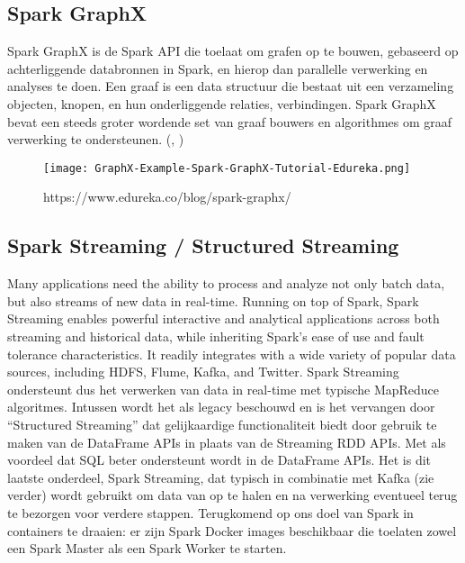 \autocite{Spark2023b}

\subsection{Spark GraphX}
Spark GraphX is de Spark API die toelaat om grafen op te bouwen, gebaseerd op achterliggende databronnen in Spark, en hierop dan parallelle verwerking en analyses te doen. 
Een graaf is een data structuur die bestaat uit een verzameling objecten, knopen, en hun onderliggende relaties, verbindingen.
Spark GraphX bevat een steeds groter wordende set van graaf bouwers en algorithmes om graaf verwerking te ondersteunen.
(\autocite{Dayananda2019}, \autocite{Wikipedia2023})
\newline
\newline
\begin{figure}
    \texttt{[image: GraphX-Example-Spark-GraphX-Tutorial-Edureka.png]}
    \caption{https://www.edureka.co/blog/spark-graphx/}
\end{figure}


\subsection{Spark Streaming / Structured Streaming}
Many applications need the ability to process and analyze not only batch data, but also streams of new data in real-time. Running on top of Spark, Spark Streaming enables powerful interactive and analytical applications across both streaming and historical data, while inheriting Spark’s ease of use and fault tolerance characteristics. It readily integrates with a wide variety of popular data sources, including HDFS, Flume, Kafka, and Twitter.\autocite{databricks2023}
\newline
\newline
Spark Streaming ondersteunt dus het verwerken van data in real-time met typische MapReduce algoritmes. Intussen wordt het als legacy beschouwd en is het vervangen door ``Structured Streaming'' dat gelijkaardige functionaliteit biedt door gebruik te maken van de DataFrame APIs in plaats van de Streaming RDD APIs. Met als voordeel dat SQL beter ondersteunt wordt in de DataFrame APIs.
\autocite{Buuck2022}
\newline
\newline
Het is dit laatste onderdeel, Spark Streaming, dat typisch in combinatie met Kafka (zie verder) wordt gebruikt om data van op te halen en na verwerking eventueel terug te bezorgen voor verdere stappen.
\newline
\newline
\newline
Terugkomend op ons doel van Spark in containers te draaien: er zijn Spark Docker images beschikbaar die toelaten zowel een Spark Master als een Spark Worker te starten.


